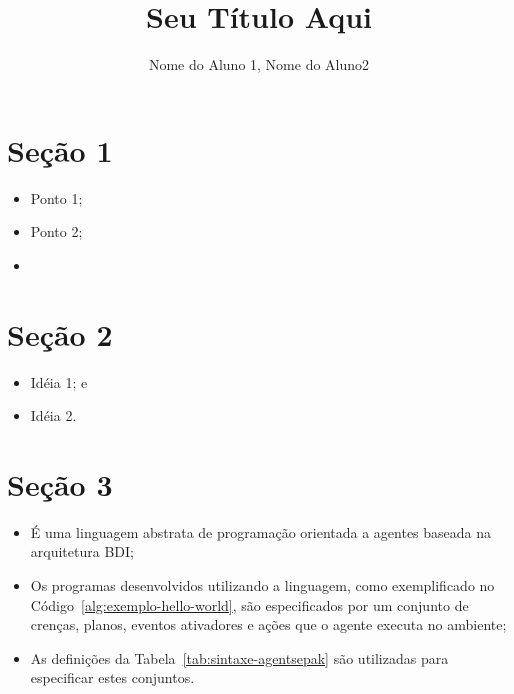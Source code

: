 \documentclass[a0,portrait]{lab-poster}
\title{Seu Título Aqui}
\author{Nome do Aluno 1, Nome do Aluno2}
\begin{document}
\maketitle


\begin{multicols}{2} 
\section*{Seção 1}
\Large
\justifying

\begin{itemize}
	\item Ponto 1;
	\item Ponto 2;
	\item 
\end{itemize}

\section*{\huge Seção 2}

\begin{itemize}
	\item Idéia 1; e
	\item Idéia 2.
\end{itemize}

\section*{\huge Seção 3}

\begin{itemize}
	\item É uma linguagem abstrata de programação orientada a agentes baseada na arquitetura BDI;
	\item Os programas desenvolvidos utilizando a linguagem, como exemplificado no Código~\ref{alg:exemplo-hello-world}, são especificados por um conjunto de crenças, planos, eventos ativadores e ações que o agente executa no ambiente;
	\item As definições da Tabela~\ref{tab:sintaxe-agentsepak} são utilizadas para especificar estes conjuntos.
\end{itemize}


\end{multicols}
\end{document}
